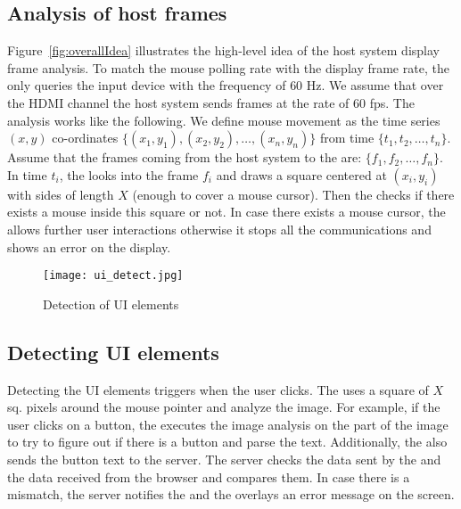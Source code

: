 \subsection{Analysis of host frames}
\label{sec:idea:analysis}

Figure~\ref{fig:overallIdea} illustrates the high-level idea of the host system display frame analysis. To match the mouse polling rate with the display frame rate, the \device only queries the input device with the frequency of $60$ Hz. We assume that over the HDMI channel the host system sends frames at the rate of $60$ fps. The analysis works like the following. We define mouse movement as the time series $(x,y)$ co-ordinates $\{(x_1,y_1), (x_2, y_2), \ldots, (x_n,y_n)\}$ from time $\{t_1, t_2, \ldots, t_n\}$. Assume that the frames coming from the host system to the \device are: $\{f_1, f_2, \ldots, f_n\}$. In time $t_i$, the \device looks into the frame $f_i$ and draws a square centered at $(x_i, y_i)$ with sides of length $X$ (enough to cover a mouse cursor). Then the \device checks if there exists a mouse inside this square or not. In case there exists a mouse cursor, the \device allows further user interactions otherwise it stops all the communications and shows an error on the display.


\begin{figure}
\centering
\texttt{[image: ui\_detect.jpg]}
\caption{Detection of UI elements}
\label{fig:uiDetect}
\centering
\end{figure}

\subsection{Detecting UI elements}

Detecting the UI elements triggers when the user clicks. The \device uses a square of $X$ sq. pixels around the mouse pointer and analyze the image. For example, if the user clicks on a button, the \device executes the image analysis on the part of the image to try to figure out if there is a button and parse the text. Additionally, the \device also sends the button text to the server. The server checks the data sent by the \device and the data received from the browser and compares them. In case there is a mismatch, the server notifies the \device and the \device overlays an error message on the screen. 


